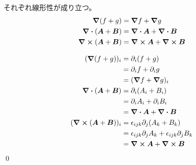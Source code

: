 \documentclass[uplatex,dvipdfmx,a4paper,11pt]{jlreq}
\makeatletter
\newcommand{\rot}{\curl}
\theoremstyle{definition}
\renewenvironment{proof}[1][\proofname]{\par
  \normalfont
  \topsep6\p@\@plus6\p@ \trivlist
  \item[\hskip\labelsep{\bfseries #1}\@addpunct{\bfseries}]\ignorespaces\quad\par
}{%
  \qed\endtrivlist\@endpefalse
}
\renewcommand\proofname{証明}
\makeatother
\begin{document}
\begin{theorem}[勾配・発散・回転の線形性]
  それぞれ線形性が成り立つ。
  \begin{align}
    \grad{(f+g)}          & = \grad{f} + \grad{g}         \\
    \div{(\bm{A}+\bm{B})} & = \div{\bm{A}} + \div{\bm{B}} \\
    \rot{(\bm{A}+\bm{B})} & = \rot{\bm{A}} + \rot{\bm{B}}
  \end{align}
\end{theorem}
\begin{proof}
  \begin{align}
    (\grad{(f+g)})_i            & = \partial_i(f+g)                                           \\
                                & = \partial_i f + \partial_i g                               \\
                                & = (\grad{f} + \grad{g})_i                                   \\
    \div{(\bm{A}+\bm{B})}       & = \partial_i(A_i + B_i)                                     \\
                                & = \partial_i A_i + \partial_i B_i                           \\
                                & = \div{\bm{A}}+\div{\bm{B}}                                 \\
    (\rot{(\bm{A} + \bm{B})})_i & = \epsilon_{ijk}\partial_j(A_k + B_k)                       \\
                                & = \epsilon_{ijk}\partial_jA_k + \epsilon_{ijk}\partial_jB_k \\
                                & = \rot{\bm{A}} + \rot{\bm{B}}
  \end{align}
\end{proof}
\end{document}

